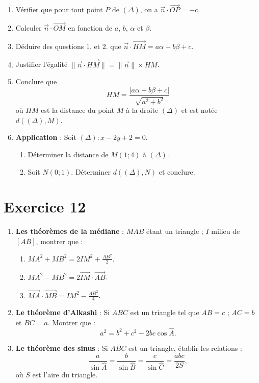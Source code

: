 \documentclass[12pt]{article}
\begin{document}
\begin{enumerate}
    \item Vérifier que pour tout point $P$ de $(\Delta)$, on a $\vec{n} \cdot \overrightarrow{OP} = -c$.

    \item Calculer $\vec{n} \cdot \overrightarrow{OM}$ en fonction de $a$, $b$, $\alpha$ et $\beta$.

    \item Déduire des questions 1. et 2. que $\vec{n} \cdot \overrightarrow{HM} = a\alpha + b\beta + c$.

    \item Justifier l’égalité $\|\vec{n} \cdot \overrightarrow{HM}\| = \|\vec{n}\| \times HM$.

    \item Conclure que 
    \[
    HM = \frac{|a\alpha + b\beta + c|}{\sqrt{a^2 + b^2}}
    \]
    où $HM$ est la distance du point $M$ à la droite $(\Delta)$ et est notée $d((\Delta), M)$.

    \item \textbf{Application} : Soit $(\Delta) : x - 2y + 2 = 0$.
    \begin{enumerate}
        \item Déterminer la distance de $M(1; 4)$ à $(\Delta)$.
        \item Soit $N(0; 1)$. Déterminer $d((\Delta), N)$ et conclure.
    \end{enumerate}
\end{enumerate}
\section*{Exercice 12}

\begin{enumerate}
    \item \textbf{Les théorèmes de la médiane} : $MAB$ étant un triangle ; $I$ milieu de $[AB]$, montrer que :
    \begin{enumerate}
        \item $MA^2 + MB^2 = 2IM^2 + \frac{AB^2}{2}$.
        \item $MA^2 - MB^2 = 2\overrightarrow{IM} \cdot \overrightarrow{AB}$.
        \item $\overrightarrow{MA} \cdot \overrightarrow{MB} = IM^2 - \frac{AB^2}{4}$.
    \end{enumerate}

    \item \textbf{Le théorème d’Alkashi} : Si $ABC$ est un triangle tel que $AB = c$ ; $AC = b$ et $BC = a$. Montrer que :
    \[
    a^2 = b^2 + c^2 - 2bc\cos\widehat{A}.
    \]

    \item \textbf{Le théorème des sinus} : Si $ABC$ est un triangle, établir les relations :
    \[
    \frac{a}{\sin\widehat{A}} = \frac{b}{\sin\widehat{B}} = \frac{c}{\sin\widehat{C}} = \frac{abc}{2S},
    \]
    où $S$ est l’aire du triangle.
\end{enumerate}
\end{document}
